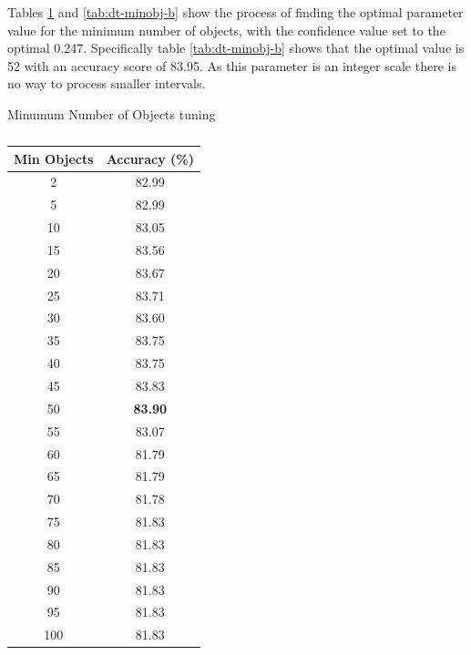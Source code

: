 \documentclass[12pt]{article}
\begin{document}
      Tables \ref{tab:dt-minobj-a} and \ref{tab:dt-minobj-b} show the process of finding the optimal parameter value for the minimum number of objects, with the confidence value set to the optimal 0.247. Specifically table \ref{tab:dt-minobj-b} shows that the optimal value is 52 with an accuracy score of 83.95. As this parameter is an integer scale there is no way to process smaller intervals.

      \singlespacing
      \begin{table}[H]
        \caption{Minumum Number of Objects tuning}
        \begin{subtable}{.5\linewidth}
          \centering
          \caption{}
          \begin{tabular}{c|c}
          \toprule
          \multicolumn{1}{l|}{Min Objects} & \multicolumn{1}{l}{Accuracy (\%)} \\
          \midrule
          2     & 82.99 \\
          5     & 82.99 \\
          10    & 83.05 \\
          15    & 83.56 \\
          20    & 83.67 \\
          25    & 83.71 \\
          30    & 83.60 \\
          35    & 83.75 \\
          40    & 83.75 \\
          45    & 83.83 \\
          50    & \textbf{83.90} \\
          55    & 83.07 \\
          60    & 81.79 \\
          65    & 81.79 \\
          70    & 81.78 \\
          75    & 81.83 \\
          80    & 81.83 \\
          85    & 81.83 \\
          90    & 81.83 \\
          95    & 81.83 \\
          100   & 81.83 \\
          \bottomrule
          \end{tabular}
          \label{tab:dt-minobj-a}
        \end{subtable}
        \begin{subtable}{.5\linewidth}

\end{subtable}
\end{table}
\end{document}
